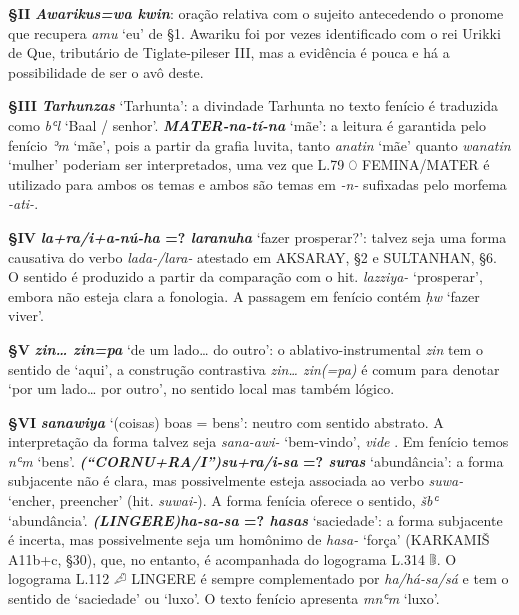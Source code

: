 \smallskip
\noindent\textbf{§II}\tabto{2em}
\textbf{\emph{Awarikus=wa kwin}}: oração relativa com o sujeito antecedendo o
pronome que recupera \emph{amu} `eu' de §1. Awariku foi por vezes
identificado com o rei Urikki de Que, tributário de Tiglate-pileser III\@,
mas a evidência é pouca e há a possibilidade de ser o avô deste.

\smallskip
\noindent\textbf{§III}\tabto{2em}
\textbf{\emph{Tarhunzas}} `Tarhunta': a divindade Tarhunta no texto fenício é
traduzida como \emph{bʿl} `Baal \slash{} senhor'.
\textbf{\emph{\emph{MATER}-na-tí-na}} `mãe': a leitura é garantida pelo fenício
\emph{ʾm} `mãe', pois a partir da grafia luvita, tanto \emph{anatin} `mãe'
quanto \emph{wanatin} `mulher' poderiam ser interpretados, uma vez que L.79 𔑘
FEMINA\slash{}MATER é utilizado para ambos os temas e ambos são temas em
\emph{-n-} sufixadas pelo morfema \emph{-ati-}.

\smallskip
\noindent\textbf{§IV}\tabto{2em}
\textbf{\emph{la+ra/i+a-nú-ha} {=?} \emph{laranuha}} `fazer prosperar?': talvez
seja uma forma causativa do verbo \emph{lada-\slash{}lara-} atestado em
AKSARAY, §2 e SULTANHAN, §6. O sentido é produzido a partir da comparação com o
hit. \emph{lazziya-} `prosperar', embora não esteja clara a fonologia.
A passagem em fenício contém \emph{ḥw} `fazer viver'.

\smallskip
\noindent\textbf{§V}\tabto{2em}
\textbf{\emph{zin\ldots{} zin=pa}} `de um lado\ldots{} do outro': o
ablativo-instrumental \emph{zin} tem o sentido de `aqui', a construção
contrastiva \emph{zin\ldots{} zin{(=pa)}} é comum para denotar `por um
lado\ldots{} por outro', no sentido local mas também lógico.


\smallskip
\noindent\textbf{§VI}\tabto{2em}
\textbf{\emph{sanawiya}} `(coisas) boas = bens': neutro com sentido abstrato. A
interpretação da forma talvez seja \emph{sana-awi-} `bem-vindo', \emph{vide}
\citet{YakubovichWelcome}. Em fenício temos \emph{nʿm} `bens'.
\textbf{\emph{\emph{(“CORNU+RA/I”)}su+ra/i-sa} {=?} \emph{suras}} `abundância':
a forma subjacente não é cla\-ra, mas possivelmente esteja associada ao verbo
\emph{suwa-} `encher, preencher' (hit. \emph{suwai-}). A forma fenícia oferece o
sentido, \emph{šbʿ} `abundância'.
\textbf{\emph{\emph{(LINGERE)}ha-sa-sa} {=?} \emph{hasas}} `saciedade': a forma
subjacente é incerta, mas possivel\-mente seja um homônimo de \emph{hasa-} `força'
(KARKAMIŠ A11b+c, §30), que, no entanto, é acompanhada do logograma L.314 𔕡.
O logograma L.112 𔒈 LINGERE é sempre complementado por \emph{ha/há-sa/sá} e tem
o sentido de `saciedade' ou `luxo'.
O texto fenício apresenta \emph{mnʿm} `luxo'.

